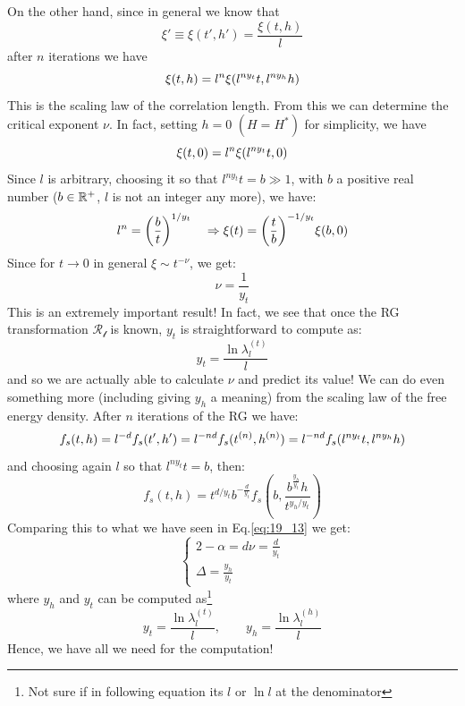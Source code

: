 \documentclass[../../Main/Main.tex]{subfiles}
\begin{document}
On the other hand, since in general we know that
\begin{equation*}
  \xi' \equiv \xi (t',h') = \frac{\xi (t,h)}{l}
\end{equation*}
after \( n \) iterations we have
\begin{equation}
  \xi (t,h) = l^n \xi \qty(l^{n y_t} t, l^{n y_h} h)
\end{equation}
This is the scaling law of the correlation length. From this we can determine the critical exponent \( \nu  \).  In fact, setting \( h=0 \) \( (H=H^*) \) for simplicity, we have
\begin{equation*}
  \xi (t,0) = l^n \xi \qty(l^{n y_t} t , 0)
\end{equation*}
Since \( l \) is arbitrary, choosing it  so that \( l^{n y_t} t = b \gg 1\), with \( b \)  a positive real number (\( b \in \mathbb{R}^+ \), \( l \) is not an integer any more), we have:
\begin{equation*}
  l^n = \qty(\frac{b}{t})^{1/y_t} \quad   \Rightarrow \xi (t) = \qty(\frac{t}{b})^{-1/y_t} \xi (b,0)
\end{equation*}
Since for \( t \rightarrow 0 \) in general \( \xi \sim t^{-\nu } \), we get:
\begin{equation}
  \nu = \frac{1}{y_t}
\end{equation}
This is an extremely important result! In fact, we see that once the RG transformation \( \mathcal{R_l} \) is known, \( y_t \) is straightforward to compute as:
\begin{equation*}
  y_t  = \frac{ \ln{\lambda _l^{(t)}}}{l}
\end{equation*}
and so we are actually able to calculate \( \nu  \) and predict its value! We can do even something more (including giving \( y_h \) a meaning) from the scaling law of the free energy density. After \( n \) iterations of the RG we have:
\begin{equation}
f_s (t,h)  = l^{-d} f_s (t',h') = l^{-nd} f_s (t^{(n)},h^{(n)})
 = l^{-nd} f_s \qty(l^{n y_t}t, l^{n y_h}h)
\end{equation}
and choosing again \( l \) so that  \( l^{n y_t} t= b \), then:
\begin{equation*}
f_s (t,h) = t^{d/y_t} b^{-\frac{d}{y_{t}}} f_s\left( b, \frac{b^{\frac{y_h}{y_{t}}}h}{t^{y_h/y_t}} \right)
\end{equation*}
Comparing this to what we have seen in Eq.\eqref{eq:19_13} we get:
\begin{equation}
  \begin{cases}
   2 - \alpha = d \nu = \frac{d}{y_t}\\
   \Delta = \frac{y_h}{y_t}
  \end{cases}
\end{equation}
where \( y_h \) and \( y_t \) can be computed as\footnote{Not sure if in following equation its $l$ or $\ln{l}$ at the denominator}
\begin{equation}
  y_t  = \frac{\ln{\lambda _l^{(t)}}}{{l} }, \qquad y_h = \frac{\ln{\lambda _l^{(h)}}}{{l} }
\end{equation}
Hence, we have all we need for the computation!
\end{document}
